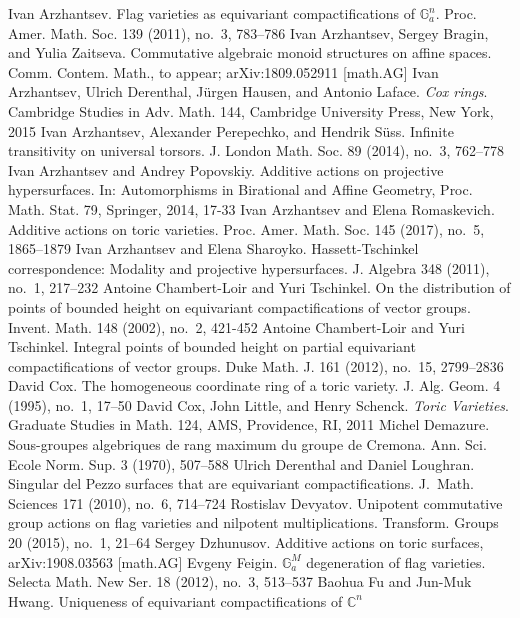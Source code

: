 \documentclass[a4paper,reqno,12pt]{amsart}
\def\C  {\mathbb C}
\theoremstyle{definition}
\begin{document}
\begin{thebibliography}{99}
Ivan Arzhantsev. Flag varieties as equivariant compactifications of $\mathbb{G}^n_a$.
Proc. Amer. Math. Soc. 139 (2011), no.~3, 783--786
%
Ivan Arzhantsev, Sergey Bragin, and Yulia Zaitseva. Commutative algebraic monoid structures on affine spaces.  Comm. Contem. Math., to appear; arXiv:1809.052911 [math.AG]
%
Ivan Arzhantsev, Ulrich Derenthal, J\"urgen Hausen, and Antonio Laface. \emph{Cox rings}.
Cambridge Studies in Adv. Math. 144, Cambridge University Press, New York, 2015
%
Ivan Arzhantsev, Alexander Perepechko, and Hendrik S\"uss. Infinite transitivity on universal
torsors. J. London Math. Soc. 89 (2014), no.~3, 762--778
%
Ivan Arzhantsev and Andrey Popovskiy. Additive actions on projective hypersurfaces. In:
Automorphisms in Birational and Affine Geometry, Proc. Math. Stat. 79,
Springer, 2014, 17-33
%
Ivan Arzhantsev and Elena Romaskevich. Additive actions on toric varieties. Proc. Amer. Math. Soc. 145 (2017), no.~5, 1865--1879
%
Ivan Arzhantsev and Elena Sharoyko. Hassett-Tschinkel correspondence:
Modality and projective hypersurfaces. J. Algebra 348 (2011), no.~1, 217--232
%
Antoine Chambert-Loir and Yuri Tschinkel. On the distribution of points of bounded
height on equivariant compactifications of vector groups. Invent. Math. 148 (2002), no.~2, 421-452
%
Antoine Chambert-Loir and Yuri Tschinkel. Integral points of bounded height on partial
equivariant compactifications of vector groups. Duke Math. J. 161 (2012), no.~15, 2799--2836
%
David Cox. The homogeneous coordinate ring of a toric variety. J. Alg. Geom. 4 (1995), no.~1, 17--50
%
David Cox, John Little, and Henry Schenck. \emph{Toric Varieties}. Graduate Studies in Math. 124, AMS, Providence, RI, 2011
%
Michel Demazure. Sous-groupes algebriques de rang maximum du groupe de Cremona. Ann. Sci. Ecole
Norm. Sup. 3 (1970), 507--588
%
Ulrich Derenthal and Daniel Loughran.
Singular del Pezzo surfaces that are equivariant compactifications.
J.~Math. Sciences 171 (2010), no.~6, 714--724
%
Rostislav Devyatov. Unipotent commutative group actions on flag varieties and nilpotent
multiplications. Transform. Groups 20 (2015), no.~1, 21--64
%
Sergey Dzhunusov. Additive actions on toric surfaces, arXiv:1908.03563 [math.AG]
%
Evgeny Feigin. $\mathbb{G}^M_a$ degeneration of flag varieties. Selecta Math. New Ser. 18 (2012),
no.~3, 513--537
%
Baohua Fu and Jun-Muk Hwang. Uniqueness of equivariant compactifications of $\C^n$

\end{thebibliography}
\end{document}
